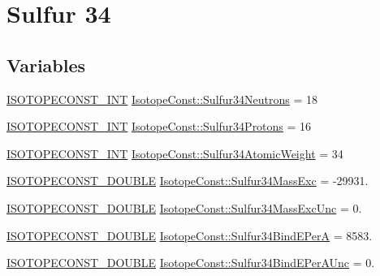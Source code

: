 \hypertarget{group___isotope_const-_sulfur-_s34}{}\section{Sulfur 34}
\label{group___isotope_const-_sulfur-_s34}
\subsection*{Variables}
\begin{DoxyCompactItemize}
\item 
\mbox{\hyperlink{group___isotope_const-_macros_ga5f18360b3e99483a35c32d789e62621c}{I\+S\+O\+T\+O\+P\+E\+C\+O\+N\+S\+T\+\_\+\+I\+NT}} \mbox{\hyperlink{group___isotope_const-_sulfur-_s34_ga4e0aa47f5ab4cff31e062a9a877543a5}{Isotope\+Const\+::\+Sulfur34\+Neutrons}} = 18
\item 
\mbox{\hyperlink{group___isotope_const-_macros_ga5f18360b3e99483a35c32d789e62621c}{I\+S\+O\+T\+O\+P\+E\+C\+O\+N\+S\+T\+\_\+\+I\+NT}} \mbox{\hyperlink{group___isotope_const-_sulfur-_s34_gae8623a24ed6c9f6db0790fb7aa9859a0}{Isotope\+Const\+::\+Sulfur34\+Protons}} = 16
\item 
\mbox{\hyperlink{group___isotope_const-_macros_ga5f18360b3e99483a35c32d789e62621c}{I\+S\+O\+T\+O\+P\+E\+C\+O\+N\+S\+T\+\_\+\+I\+NT}} \mbox{\hyperlink{group___isotope_const-_sulfur-_s34_ga0e72962563df57e3ca9bbbb73f5a2e3f}{Isotope\+Const\+::\+Sulfur34\+Atomic\+Weight}} = 34
\item 
\mbox{\hyperlink{group___isotope_const-_macros_ga8f45a7272ce02c0b4c65c44636ed719a}{I\+S\+O\+T\+O\+P\+E\+C\+O\+N\+S\+T\+\_\+\+D\+O\+U\+B\+LE}} \mbox{\hyperlink{group___isotope_const-_sulfur-_s34_gafa1f7bd74dd5e2a009fc44a2821f68d2}{Isotope\+Const\+::\+Sulfur34\+Mass\+Exc}} = -\/29931.
\item 
\mbox{\hyperlink{group___isotope_const-_macros_ga8f45a7272ce02c0b4c65c44636ed719a}{I\+S\+O\+T\+O\+P\+E\+C\+O\+N\+S\+T\+\_\+\+D\+O\+U\+B\+LE}} \mbox{\hyperlink{group___isotope_const-_sulfur-_s34_gaccacfe0907d6c1e7637133dceff93a57}{Isotope\+Const\+::\+Sulfur34\+Mass\+Exc\+Unc}} = 0.
\item 
\mbox{\hyperlink{group___isotope_const-_macros_ga8f45a7272ce02c0b4c65c44636ed719a}{I\+S\+O\+T\+O\+P\+E\+C\+O\+N\+S\+T\+\_\+\+D\+O\+U\+B\+LE}} \mbox{\hyperlink{group___isotope_const-_sulfur-_s34_gaf769cd9a5459d5bdea95f0c1ba10ac06}{Isotope\+Const\+::\+Sulfur34\+Bind\+E\+PerA}} = 8583.
\item 
\mbox{\hyperlink{group___isotope_const-_macros_ga8f45a7272ce02c0b4c65c44636ed719a}{I\+S\+O\+T\+O\+P\+E\+C\+O\+N\+S\+T\+\_\+\+D\+O\+U\+B\+LE}} \mbox{\hyperlink{group___isotope_const-_sulfur-_s34_gab4987ca035134b751f1ef6c5bdb966bd}{Isotope\+Const\+::\+Sulfur34\+Bind\+E\+Per\+A\+Unc}} = 0.

\end{DoxyCompactItemize}
